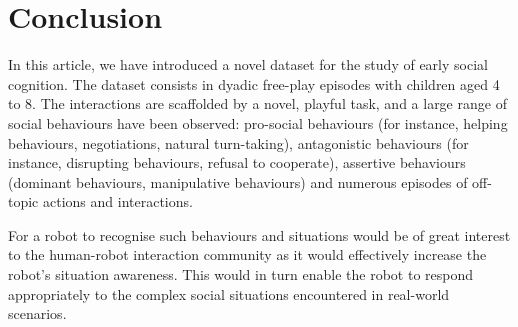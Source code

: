 \documentclass{article}
\begin{document}
%
%
%

\section{Conclusion}
%
%

In this article, we have introduced a novel dataset for the study of early
social cognition. The dataset consists in dyadic free-play episodes with
children aged 4 to 8. The interactions are scaffolded by a novel, playful task,
and a large range of social behaviours have been observed: pro-social behaviours
(for instance, helping behaviours, negotiations, natural turn-taking),
antagonistic behaviours (for instance, disrupting behaviours, refusal to
cooperate), assertive behaviours (dominant behaviours, manipulative behaviours)
and numerous episodes of off-topic actions and interactions.

For a robot to recognise such behaviours and situations would be of great
interest to the human-robot interaction community as it would effectively
increase the robot's situation awareness. This would in turn enable the robot to
respond appropriately to the complex social situations encountered in real-world
scenarios.
\end{document}
